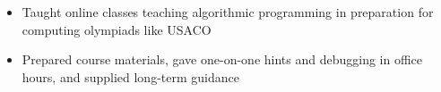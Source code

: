 {
	\begin{itemize}
		\item Taught online classes teaching algorithmic programming in preparation for computing olympiads like USACO
		\item Prepared course materials, gave one-on-one hints and debugging in office hours, and supplied long-term guidance
	\end{itemize}
}
